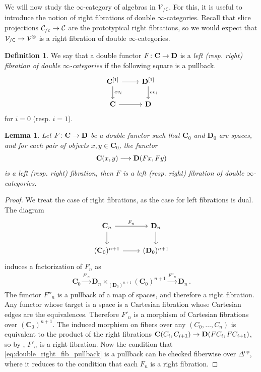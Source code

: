 \documentclass[10pt]{amsart}
\numberwithin{equation}{section}
\newtheorem{lem}[prop]{Lemma}
\theoremstyle{definition}
\newtheorem{definition}[prop]{Definition}
\DeclareMathOperator{\op}{op}
\newcommand{\Simp}{\mathbb{\Delta}}
\newcommand{\cC}{\mathcal{C}}
\newcommand{\cV}{\mathcal{V}}
\newcommand{\bfC}{\mathbf{C}}
\newcommand{\bfD}{\mathbf{D}}
\newcommand{\sfC}{\mathsf{C}}
\renewcommand{\to}{\mathchoice{\longrightarrow}{\rightarrow}{}{}}
\begin{document}
	We will now study the $\infty$-category of algebras in $\cV_{/\sfC}$. For this, it is useful to introduce the notion of right fibrations of double $\infty$-categories. Recall that slice projections $\cC_{/c} \to \cC$ are the prototypical right fibrations, so we would expect that $\cV_{/\sfC} \to \cV^{\otimes}$ is a right fibration of double $\infty$-categories.


	\begin{definition}\label{def:double_right_fib}
		We say that a double functor $F\colon \bfC \to \bfD$ is a \emph{left (resp. right) fibration of double $\infty$-categories} if the following square is a pullback.
		\begin{equation}\label{eq:double_right_fib_pullback}
			\begin{tikzcd}
				\bfC^{[1]} \arrow[r] \arrow[d,"ev_i"]      &  \bfD^{[1]}   \arrow[d,"ev_{i}"] \\
				\bfC \arrow[r]                & \bfD
			\end{tikzcd}
		\end{equation}
		for $i=0$ (resp. $i=1$).
	\end{definition}

	\begin{lem}\label{lem:double_right_fib_condition}
		Let $F\colon \bfC\to \bfD$ be a double functor such that $\bfC_{0}$ and $\bfD_{0}$ are spaces, and for each pair of objects $x,y\in \bfC_{0}$, the functor
		\begin{align*}
			\bfC(x,y) \to \bfD(Fx,Fy)
		\end{align*}
		is a left (resp. right) fibration, then $F$ is a left (resp. right) fibration of double $\infty$-categories.
	\end{lem}
	\begin{proof}
		We treat the case of right fibrations, as the case for left fibrations is dual.
		The diagram
		\begin{equation*}
			\begin{tikzcd}
				\bfC_{n} \arrow[r, "F_{n}"] \arrow[d] & \bfD_{n} \arrow[d] \\
				(\bfC_{0})^{n+1} \arrow[r] & (\bfD_{0})^{n+1}
			\end{tikzcd}
		\end{equation*}
		induces a factorization of $F_{n}$ as
		\begin{align*}
			\bfC_{0} \xrightarrow{F'_{n}} \bfD_{n} \times_{(\bfD_{0})^{n+1}} (\bfC_{0})^{n+1} \xrightarrow{F''_{n}} \bfD_{n} \,.
		\end{align*}
		The functor $F''_{n}$ is a pullback of a map of spaces, and therefore a right fibration.
		Any functor whose target is a space is a Cartesian fibration whose Cartesian edges are the equivalences.
		Therefore $F'_{n}$ is a morphism of Cartesian fibrations over $(\bfC_{0})^{n+1}$.
		The induced morphism on fibers over any $(C_{0},\dots, C_n)$ is equivalent to the product of the right fibrations $\bfC(C_{i}, C_{i+1}) \to \bfD(FC_{i}, FC_{i+1})$, so by , $F'_{n}$ is a right fibration.
		Now the condition that \eqref{eq:double_right_fib_pullback} is a pullback can be checked fiberwise over $\Simp^{\op}$, where it reduces to the condition that each $F_{n}$ is a right fibration.
	\end{proof}
\end{document}
